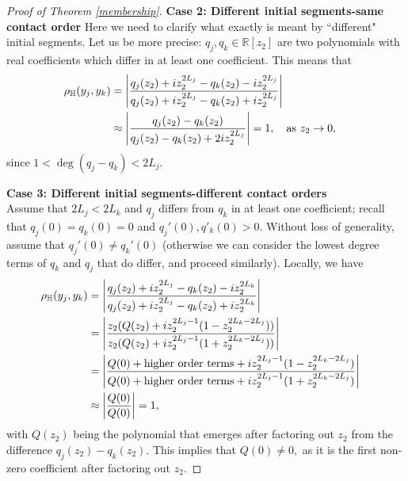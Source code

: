 \documentclass[11pt]{amsart}
\numberwithin{equation}{section}
\begin{document}
\begin{proof}[Proof of Theorem \ref{membership}]
\textbf{Case 2: Different initial segments-same contact order} Here we need to clarify what exactly is meant by ``different" initial segments. Let us be more precise: $q_j,q_k\in \mathbb{R}[z_2]$ are two polynomials with real coefficients which differ in at least one coefficient. This means that 
\begin{align}
\rho_{\mathbb{H}}(y_j,y_k)&=\left|\frac{q_{j}(z_2)+iz_2^{2L_j}-q_{k}(z_2)-iz_2^{2L_j}}{q_{j}(z_2)+iz_2^{2L_j}-q_{k}(z_2)+iz_2^{2L_j}}\right|&&\\
&\approx \left|\frac{q_j(z_2)-q_k(z_2)}{q_j(z_2)-q_k(z_2)+2iz_2^{2L_j}}\right|=1 \notag, \quad \textrm{as}\,\, z_2\to 0,
\end{align}
since $1<\deg(q_j-q_k)<2L_j.$  

\textbf{Case 3: Different initial segments-different contact orders}\\
Assume that $2L_j<2L_k$ and $q_j$ differs from $q_k$ in at least one coefficient; recall that $q_j(0)=q_k(0)=0$ and $q_j'(0),q'_k(0)>0.$ Without loss of generality, assume that $q_j'(0)\neq q_k'(0)$ (otherwise we can consider the lowest degree terms of $q_k$ and $q_j$ that do differ, and proceed similarly). Locally, we have 
\begin{align}
\rho_{\mathbb{H}}(y_j,y_k)&=\left|\frac{q_{j}(z_2)+iz_2^{2L_j}-q_{k}(z_2)-iz_2^{2L_k}}{q_{j}(z_2)+iz_2^{2L_j}-q_{k}(z_2)+iz_2^{2L_k}}\right| &&\\
&=\left|\frac{z_2(Q(z_2)+iz_2^{2L_j-1}(1-z_2^{2L_k-2L_j}))}{z_2(Q(z_2)+iz_2^{2L_j-1}(1+z_2^{2L_k-2L_j}))}\right| \notag&&\\
&=\left|\frac{Q(0)+\text{higher order terms}+iz_2^{2L_j-1}(1-z_2^{2L_k-2L_j})}{Q(0)+\text{higher order terms}+iz_2^{2L_j-1}(1+z_2^{2L_k-2L_j})}\right|\notag&&\\
&\approx\left|\frac{Q(0)}{Q(0)}\right|= 1, \notag
\end{align}
with $Q(z_2)$ being the polynomial that emerges after factoring out $z_2$ from the difference $q_j(z_2)-q_k(z_2). $ This implies that $Q(0)\neq 0,$ as it is the first non-zero coefficient after factoring out $z_2.$ 


\end{proof}
\end{document}
